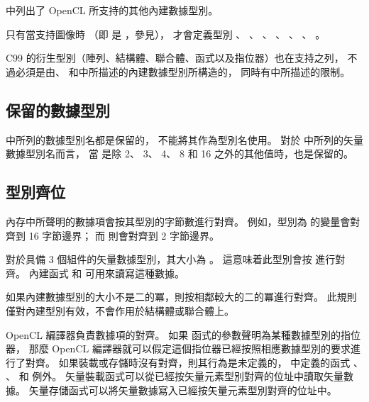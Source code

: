 中列出了 OpenCL 所支持的其他內建數據型別。

{}

\startnotepar
只有當支持圖像時
（即  是 ，參見），
才會定義型別 、 、 、
 、 、 、
 。
\stopnotepar

C99 的衍生型別（陣列、結構體、聯合體、函式以及指位器）也在支持之列，
不過必須是由、
和中所描述的內建數據型別所構造的，
同時有中所描述的限制。

\subsection{保留的數據型別}

 中所列的數據型別名都是保留的，
不能將其作為型別名使用。
對於 中所列的矢量數據型別名而言，
當  是除 2、 3、 4、 8 和 16 之外的其他值時，也是保留的。

{}

\subsection[sec:alignmentOfTypes]{型別齊位}

內存中所聲明的數據項會按其型別的字節數進行對齊。
例如，型別為  的變量會對齊到 16 字節邊界；
而  則會對齊到 2 字節邊界。

對於具備 3 個組件的矢量數據型別，其大小為 。
這意味着此型別會按  進行對齊。
內建函式  和  可用來讀寫這種數據。

如果內建數據型別的大小不是二的冪，則按相鄰較大的二的冪進行對齊。
此規則僅對內建型別有效，不會作用於結構體或聯合體上。

OpenCL 編譯器負責數據項的對齊。
如果  函式的參數聲明為某種數據型別的指位器，
那麼 OpenCL 編譯器就可以假定這個指位器已經按照相應數據型別的要求進行了對齊。
如果裝載或存儲時沒有對齊，則其行為是未定義的，
中定義的函式 、 、
  和  例外。
矢量裝載函式可以從已經按矢量元素型別對齊的位址中讀取矢量數據。
矢量存儲函式可以將矢量數據寫入已經按矢量元素型別對齊的位址中。


